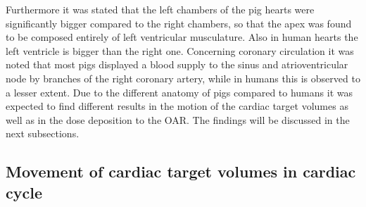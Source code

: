 \documentclass[type=dr, dr=rernat, accentcolor=tud7b,colorbacktitle, bigchapter, openright, twoside, 12pt ]{tudthesis}
\begin{document}
Furthermore it was stated that the left chambers of the pig hearts were significantly bigger compared to the right chambers, so that the 
apex was found to be composed entirely of left ventricular musculature. Also in human hearts the left ventricle is bigger than the right one. 
Concerning coronary circulation it was noted that most pigs displayed a blood supply to the sinus and atrioventricular node by branches 
of the right coronary artery, while in humans this is observed to a lesser extent.\newline
\newline
Due to the different anatomy of pigs compared to humans it was expected to find different results in the motion of the cardiac target volumes 
as well as in the dose deposition to the OAR. The findings will be discussed in the next subsections. 

\subsection{Movement of cardiac target volumes in cardiac cycle}
\end{document}
